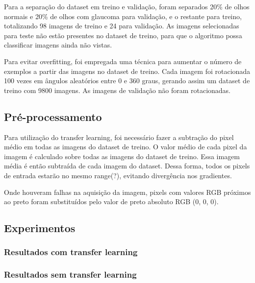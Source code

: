 \documentclass[conference]{IEEEtran}
\begin{document}
  Para a separação do dataset em treino e validação, foram separados 20\% de olhos normais e 20\% de olhos com glaucoma para validação, e o restante para treino, totalizando 98 imagens de treino e 24 para validação. As imagens selecionadas para teste não estão presentes no dataset de treino, para que o algoritmo possa classificar imagens ainda não vistas.

  Para evitar overfitting, foi empregada uma técnica para aumentar o número de exemplos a partir das imagens no dataset de treino. Cada imagem foi rotacionada 100 vezes em ângulos aleatórios entre 0 e 360 graus, gerando assim um dataset de treino com 9800 imagens. As imagens de validação não foram rotacionadas.


  \subsection{Pré-processamento}

  Para utilização do transfer learning, foi necessário fazer a subtração do pixel médio em todas as imagens do dataset de treino. O valor médio de cada pixel da imagem é calculado sobre todas as imagens do dataset de treino. Essa imagem média é então subtraída de cada imagem do dataset. Dessa forma, todos os pixels de entrada estarão no mesmo range(?), evitando divergência nos gradientes.

  Onde houveram falhas na aquisição da imagem, pixels com valores RGB próximos ao preto foram substituídos pelo valor de preto absoluto RGB (0, 0, 0).


  \subsection{Experimentos}

  \subsubsection{Resultados com transfer learning}


  \subsubsection{Resultados sem transfer learning}
\end{document}
